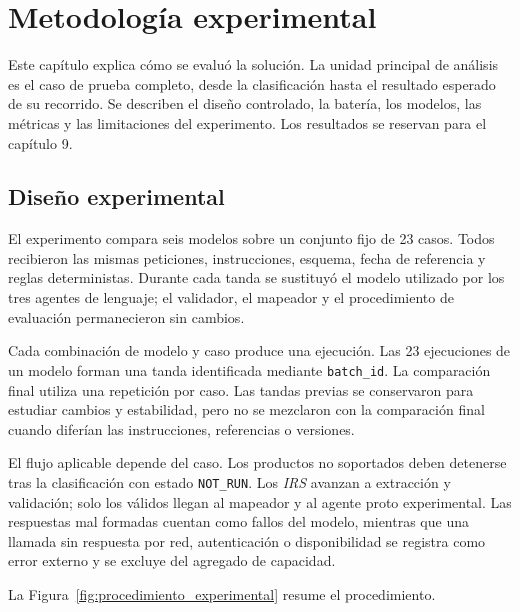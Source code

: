 \chapter{Metodología experimental}
\label{cap:metodologia_experimental}

Este capítulo explica cómo se evaluó la solución. La unidad principal de análisis es el caso de prueba completo, desde la clasificación hasta el resultado esperado de su recorrido. Se describen el diseño controlado, la batería, los modelos, las métricas y las limitaciones del experimento. Los resultados se reservan para el capítulo 9.

\section{Diseño experimental}
\label{sec:diseno_experimental}

El experimento compara seis modelos sobre un conjunto fijo de 23 casos. Todos recibieron las mismas peticiones, instrucciones, esquema, fecha de referencia y reglas deterministas. Durante cada tanda se sustituyó el modelo utilizado por los tres agentes de lenguaje; el validador, el mapeador y el procedimiento de evaluación permanecieron sin cambios.

Cada combinación de modelo y caso produce una ejecución. Las 23 ejecuciones de un modelo forman una tanda identificada mediante \texttt{batch\_id}. La comparación final utiliza una repetición por caso. Las tandas previas se conservaron para estudiar cambios y estabilidad, pero no se mezclaron con la comparación final cuando diferían las instrucciones, referencias o versiones.

El flujo aplicable depende del caso. Los productos no soportados deben detenerse tras la clasificación con estado \texttt{NOT\_RUN}. Los \textit{IRS} avanzan a extracción y validación; solo los válidos llegan al mapeador y al agente proto experimental. Las respuestas mal formadas cuentan como fallos del modelo, mientras que una llamada sin respuesta por red, autenticación o disponibilidad se registra como error externo y se excluye del agregado de capacidad.

La Figura~\ref{fig:procedimiento_experimental} resume el procedimiento.

